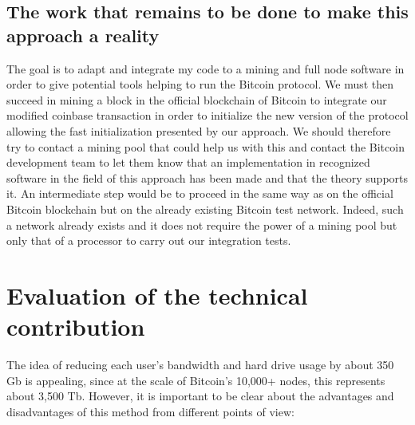 \documentclass[12pt,a4paper]{article}
\begin{document}
	\subsection{The work that remains to be done to make this approach a reality}
	
	The goal is to adapt and integrate my code to a mining and full node software in order to give potential tools helping to run the Bitcoin protocol. We must then succeed in mining a block in the official blockchain of Bitcoin to integrate our modified coinbase transaction in order to initialize the new version of the protocol allowing the fast initialization presented by our approach. We should therefore try to contact a mining pool that could help us with this and contact the Bitcoin development team to let them know that an implementation in recognized software in the field of this approach has been made and that the theory supports it. An intermediate step would be to proceed in the same way as on the official Bitcoin blockchain but on the already existing Bitcoin test network. Indeed, such a network already exists and it does not require the power of a mining pool but only that of a processor to carry out our integration tests.\\
		
	\section{Evaluation of the technical contribution}
	
	The idea of reducing each user's bandwidth and hard drive usage by about 350 Gb is appealing, since at the scale of Bitcoin's 10,000+ nodes, this represents about 3,500 Tb. However, it is important to be clear about the advantages and disadvantages of this method from different points of view:
	
\end{document}
